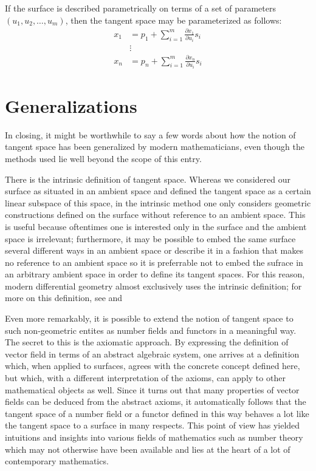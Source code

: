 \documentclass[12pt]{article}
\begin{document}
If the surface is described parametrically on terms of a set of parameters $(u_1, u_2, \ldots, u_m)$, then the tangent space may be parameterized as follows:
 $$\begin{matrix} x_1 &= p_1 + \sum_{i = 1}^m \frac{\partial x_1}{\partial u_i} s_i \\ &\vdots \\ x_n &= p_n + \sum_{i = 1}^m \frac{\partial x_n}{\partial u_i} s_i \end{matrix}$$

\section{Generalizations}

In closing, it might be worthwhile to say a few words about how the notion of tangent space has been generalized by modern mathematicians, even though the methods used lie well beyond the scope of this entry.

There is the intrinsic definition of tangent space.  Whereas we considered our surface as situated in an ambient space and defined the tangent space as a certain linear subspace of this space, in the intrinsic method one only considers geometric constructions defined on the surface without reference to an ambient space.  This is useful because oftentimes one is interested only in the surface and the ambient space is irrelevant; furthermore, it may be possible to embed the same surface several different ways in an ambient space or describe it in a fashion that makes no reference to an ambient space so it is preferrable not to embed the sufrace in an arbitrary ambient space in order to define its tangent spaces.  For this reason, modern differential geometry almost exclusively uses the intrinsic definition; for more on this definition, see  and 

Even more remarkably, it is possible to extend the notion of tangent space to such non-geometric entites as number fields and functors in a meaningful way.  The secret to this is the axiomatic approach.  By expressing the definition of vector field in terms of an abstract algebraic system, one arrives at a definition which, when applied to surfaces, agrees with the concrete concept defined here, but which, with a different interpretation of the axioms, can apply to other mathematical objects as well.  Since it turns out that many properties of vector fields can be deduced from the abstract axioms, it automatically follows that the tangent space of a number field or a functor defined in this way behaves a lot like the tangent space to a surface in many respects.  This point of view has yielded intuitions and insights into various fields of mathematics such as number theory which may not otherwise have been available and lies at the heart of a lot of contemporary mathematics.
\end{document}
